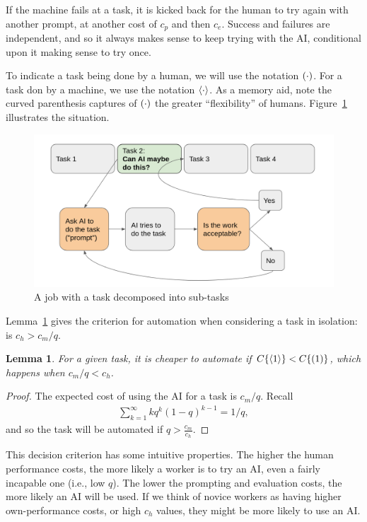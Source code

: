 \documentclass{article}
\newtheorem{lemma}[theorem]{Lemma}
\begin{document}
If the machine fails at a task, it is kicked back for the human to try again with another prompt, at another cost of $c_p$ and then $c_e$.
Success and failures are independent, and so it always makes sense to keep trying with the AI, conditional upon it making sense to try once.


To indicate a task being done by a human, we will use the notation $( \cdot )$.
For a task don by a machine, we use the notation $\langle \cdot \rangle$.
As a memory aid, note the curved parenthesis captures of $( \cdot{} )$ the greater ``flexibility'' of humans. 
Figure~\ref{fig:flow} illustrates the situation.

\begin{figure}
\caption{A job with a task decomposed into sub-tasks} \label{fig:flow}
\includegraphics[width = \textwidth]{flow.png}
\end{figure}

Lemma~\ref{lemma:when} gives the criterion for automation when considering a task in isolation: is $c_h > c_m / q$.

\begin{lemma} \label{lemma:when}
 For a given task, it is cheaper to automate if $C\{ \langle 1 \rangle \} < C\{ ( 1 ) \}$, which happens when $c_m / q < c_h$.
\end{lemma}
\begin{proof}
  The expected cost of using the AI for a task is $c_m/q$.
  Recall
  \begin{align}
    \sum_{k=1}^\infty k q^k (1-q)^{k-1} = 1/q,
  \end{align}
and so the task will be automated if $q > \frac{c_m}{c_h}.$
\end{proof}

This decision criterion has some intuitive properties.
The higher the human performance costs, the more likely a worker is to try an AI, even a fairly incapable one (i.e., low $q$).
The lower the prompting and evaluation costs, the more likely an AI will be used.
If we think of novice workers as having higher own-performance costs, or high $c_h$ values, they might be more likely to use an AI.
\end{document}
